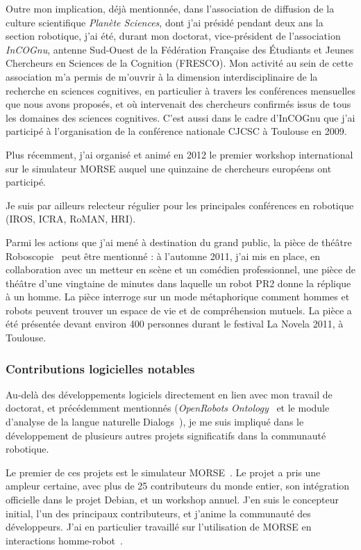 \documentclass[a4paper]{article}
\begin{document}
Outre mon implication, déjà mentionnée, dans l'association de diffusion de la
culture scientifique \emph{Planète Sciences}, dont j'ai présidé pendant deux ans
la section robotique, j'ai été, durant mon doctorat, vice-président de
l'association \emph{InCOGnu}, antenne Sud-Ouest de la Fédération Française des
Étudiants et Jeunes Chercheurs en Sciences de la Cognition (FRESCO). Mon
activité au sein de cette association m'a permis de m'ouvrir à la dimension
interdisciplinaire de la recherche en sciences cognitives, en particulier à
travers les conférences mensuelles que nous avons proposés, et où intervenait
des chercheurs confirmés issus de tous les domaines des sciences cognitives.
C'est aussi dans le cadre d'InCOGnu que j'ai participé à l'organisation de la
conférence nationale CJCSC à Toulouse en 2009.

Plus récemment, j'ai organisé et animé en 2012 le premier workshop international
sur le simulateur MORSE auquel une quinzaine de chercheurs européens ont participé.

Je suis par ailleurs relecteur régulier pour les principales conférences en
robotique (IROS, ICRA, RoMAN, HRI).

Parmi les actions que j'ai mené à destination du grand public, la pièce de
théâtre Roboscopie~\cite{lemaignan2012roboscopie} peut être mentionné : à l'automne
2011, j'ai mis en place, en collaboration avec un metteur en scène et un
comédien professionnel, une pièce de théâtre d'une vingtaine de minutes dans
laquelle un robot PR2 donne la réplique à un homme. La pièce interroge sur un
mode métaphorique comment hommes et robots peuvent trouver un espace de vie et
de compréhension mutuels. La pièce a été présentée devant environ 400 personnes
durant le festival La Novela 2011, à Toulouse.

\subsubsection{Contributions logicielles notables}

Au-delà des développements logiciels directement en lien avec mon travail de
doctorat, et précédemment mentionnés (\emph{OpenRobots
Ontology}~\cite{Lemaignan2010} et le module d'analyse de la langue naturelle
{\sc Dialogs}~\cite{Lemaignan2011a}), je me suis impliqué dans le développement
de plusieurs autres projets significatifs dans la communauté robotique.

Le premier de ces projets est le simulateur MORSE~\cite{Echeverria2011,
echeverria2012simulating}. Le projet a pris une ampleur certaine, avec plus de
25 contributeurs du monde entier, son intégration officielle dans le projet
Debian, et un workshop annuel. J'en suis le concepteur initial, l'un des
principaux contributeurs, et j'anime la communauté des développeurs. J'ai en
particulier travaillé sur l'utilisation de MORSE en interactions
homme-robot~\cite{lemaignan2012morse}.
\end{document}
